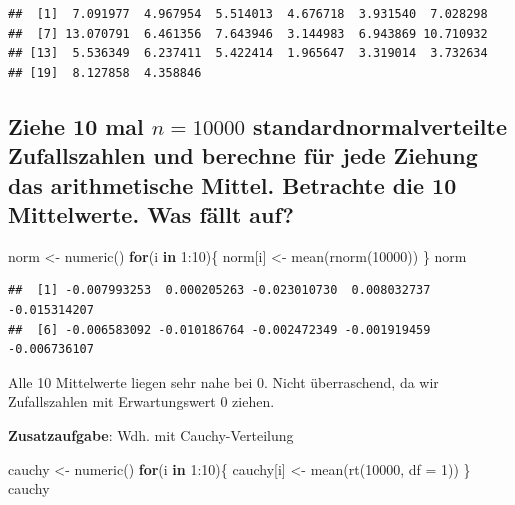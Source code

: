 \documentclass[12pt,a4paper]{article}
\newenvironment{Shaded}{\begin{snugshade}}{\end{snugshade}}
\newcommand{\AttributeTok}[1]{\textcolor[rgb]{0.77,0.63,0.00}{#1}}
\newcommand{\ControlFlowTok}[1]{\textcolor[rgb]{0.13,0.29,0.53}{\textbf{#1}}}
\newcommand{\DecValTok}[1]{\textcolor[rgb]{0.00,0.00,0.81}{#1}}
\newcommand{\FunctionTok}[1]{\textcolor[rgb]{0.00,0.00,0.00}{#1}}
\newcommand{\NormalTok}[1]{#1}
\newcommand{\OtherTok}[1]{\textcolor[rgb]{0.56,0.35,0.01}{#1}}
\newcommand{\SpecialCharTok}[1]{\textcolor[rgb]{0.00,0.00,0.00}{#1}}
\begin{document}
\begin{verbatim}
##  [1]  7.091977  4.967954  5.514013  4.676718  3.931540  7.028298
##  [7] 13.070791  6.461356  7.643946  3.144983  6.943869 10.710932
## [13]  5.536349  6.237411  5.422414  1.965647  3.319014  3.732634
## [19]  8.127858  4.358846
\end{verbatim}

\hypertarget{ziehe-10-mal-n-10000-standardnormalverteilte-zufallszahlen-und-berechne-fuxfcr-jede-ziehung-das-arithmetische-mittel.-betrachte-die-10-mittelwerte.-was-fuxe4llt-auf}{%
\subsection{\texorpdfstring{Ziehe 10 mal \(n = 10000\)
standardnormalverteilte Zufallszahlen und berechne für jede Ziehung das
arithmetische Mittel. Betrachte die 10 Mittelwerte. Was fällt
auf?}{Ziehe 10 mal n = 10000 standardnormalverteilte Zufallszahlen und berechne für jede Ziehung das arithmetische Mittel. Betrachte die 10 Mittelwerte. Was fällt auf?}}\label{ziehe-10-mal-n-10000-standardnormalverteilte-zufallszahlen-und-berechne-fuxfcr-jede-ziehung-das-arithmetische-mittel.-betrachte-die-10-mittelwerte.-was-fuxe4llt-auf}}

\begin{Shaded}
\begin{Highlighting}[]
\NormalTok{    norm }\OtherTok{\textless{}{-}} \FunctionTok{numeric}\NormalTok{()}
    \ControlFlowTok{for}\NormalTok{(i }\ControlFlowTok{in} \DecValTok{1}\SpecialCharTok{:}\DecValTok{10}\NormalTok{)\{}
\NormalTok{      norm[i] }\OtherTok{\textless{}{-}} \FunctionTok{mean}\NormalTok{(}\FunctionTok{rnorm}\NormalTok{(}\DecValTok{10000}\NormalTok{))}
\NormalTok{    \}}
\NormalTok{    norm}
\end{Highlighting}
\end{Shaded}

\begin{verbatim}
##  [1] -0.007993253  0.000205263 -0.023010730  0.008032737 -0.015314207
##  [6] -0.006583092 -0.010186764 -0.002472349 -0.001919459 -0.006736107
\end{verbatim}

Alle 10 Mittelwerte liegen sehr nahe bei 0. Nicht überraschend, da wir
Zufallszahlen mit Erwartungswert 0 ziehen.

\textbf{Zusatzaufgabe}: Wdh. mit Cauchy-Verteilung

\begin{Shaded}
\begin{Highlighting}[]
\NormalTok{    cauchy }\OtherTok{\textless{}{-}} \FunctionTok{numeric}\NormalTok{()}
    \ControlFlowTok{for}\NormalTok{(i }\ControlFlowTok{in} \DecValTok{1}\SpecialCharTok{:}\DecValTok{10}\NormalTok{)\{}
\NormalTok{      cauchy[i] }\OtherTok{\textless{}{-}} \FunctionTok{mean}\NormalTok{(}\FunctionTok{rt}\NormalTok{(}\DecValTok{10000}\NormalTok{, }\AttributeTok{df =} \DecValTok{1}\NormalTok{))}
\NormalTok{    \}}
\NormalTok{    cauchy}
\end{Highlighting}
\end{Shaded}
\end{document}
